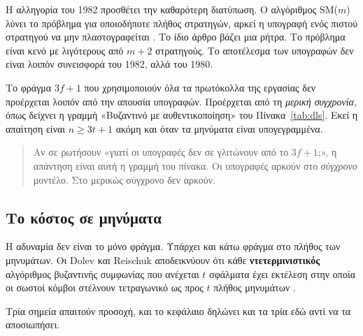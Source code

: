 Η αλληγορία του 1982 προσθέτει την καθαρότερη διατύπωση. Ο αλγόριθμος
SM($m$) λύνει το πρόβλημα για οποιοδήποτε πλήθος στρατηγών, αρκεί η
υπογραφή ενός πιστού στρατηγού να μην πλαστογραφείται
\cite{lamport1982byzantine}. Το ίδιο άρθρο βάζει μια ρήτρα. Το πρόβλημα
είναι κενό με λιγότερους από $m{+}2$ στρατηγούς. Το αποτέλεσμα των
υπογραφών δεν είναι λοιπόν συνεισφορά του 1982, αλλά του 1980.

Το φράγμα $3f{+}1$ που χρησιμοποιούν όλα τα πρωτόκολλα της εργασίας δεν
προέρχεται λοιπόν από την απουσία υπογραφών. Προέρχεται από τη
\emph{μερική συγχρονία}, όπως δείχνει η γραμμή «Βυζαντινό με
αυθεντικοποίηση» του Πίνακα~\ref{tab:dls}. Εκεί η απαίτηση είναι
$n \ge 3t{+}1$ ακόμη και όταν τα μηνύματα είναι υπογεγραμμένα.

\begin{quote}\small
Αν σε ρωτήσουν «γιατί οι υπογραφές δεν σε γλιτώνουν από το $3f{+}1$;», η
απάντηση είναι αυτή η γραμμή του πίνακα. Οι υπογραφές αρκούν στο
\emph{σύγχρονο} μοντέλο. Στο μερικώς σύγχρονο δεν αρκούν.
\end{quote}

\subsection{Το κόστος σε μηνύματα}

Η αδυναμία δεν είναι το μόνο φράγμα. Υπάρχει και κάτω φράγμα στο πλήθος
των μηνυμάτων. Οι Dolev και Reischuk αποδεικνύουν ότι κάθε
\textbf{ντετερμινιστικός} αλγόριθμος βυζαντινής συμφωνίας που ανέχεται
$t$ σφάλματα έχει εκτέλεση στην οποία οι σωστοί κόμβοι στέλνουν
τετραγωνικό ως προς $t$ πλήθος μηνυμάτων \cite{dolev1985bounds}.

Τρία σημεία απαιτούν προσοχή, και το κεφάλαιο δηλώνει και τα τρία εδώ
αντί να τα αποσιωπήσει.

